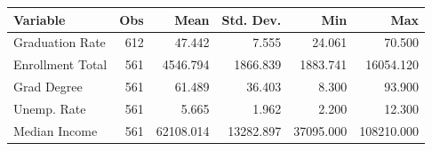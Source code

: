 \begin{tabular}{lrrrrr}
\hline
Variable & Obs & Mean & Std. Dev. & Min & Max \\
\hline
Graduation Rate & 612 & 47.442 & 7.555 & 24.061 & 70.500 \\
Enrollment Total & 561 & 4546.794 & 1866.839 & 1883.741 & 16054.120 \\
Grad Degree & 561 & 61.489 & 36.403 & 8.300 & 93.900 \\
Unemp. Rate & 561 & 5.665 & 1.962 & 2.200 & 12.300 \\
Median Income & 561 & 62108.014 & 13282.897 & 37095.000 & 108210.000 \\
\hline
\end{tabular}
